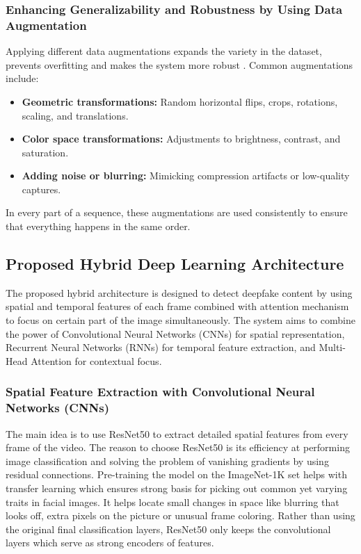 \documentclass[conference]{IEEEtran}
\begin{document}
\subsubsection{Enhancing Generalizability and Robustness by Using Data Augmentation}
Applying different data augmentations expands the variety in the dataset, prevents overfitting and makes the system more robust \cite{papakipos2022augly}. Common augmentations include:
\begin{itemize}
    \item \textbf{Geometric transformations:} Random horizontal flips, crops, rotations, scaling, and translations.
    \item \textbf{Color space transformations:} Adjustments to brightness, contrast, and saturation.
    \item \textbf{Adding noise or blurring:} Mimicking compression artifacts or low-quality captures.
\end{itemize}
In every part of a sequence, these augmentations are used consistently to ensure that everything happens in the same order.


\subsection{Proposed Hybrid Deep Learning Architecture}
The proposed hybrid architecture is designed to detect deepfake content by using spatial and temporal features of each frame combined with attention mechanism to focus on certain part of the image simultaneously. The system aims to combine the power of Convolutional Neural Networks (CNNs) for spatial representation, Recurrent Neural Networks (RNNs) for temporal feature extraction, and Multi-Head Attention for contextual focus.

\subsubsection{Spatial Feature Extraction with Convolutional Neural Networks (CNNs)}


The main idea is to use ResNet50 to extract detailed spatial features from every frame of the video. The reason to choose ResNet50 is its efficiency at performing image classification and solving the problem of vanishing gradients by using residual connections. Pre-training the model on the ImageNet-1K set helps with transfer learning which ensures strong basis for picking out common yet varying traits in facial images. It helps locate small changes in space like blurring that looks off, extra pixels on the picture or unusual frame coloring. Rather than using the original final classification layers, ResNet50 only keeps the convolutional layers which serve as strong encoders of features.
\end{document}
